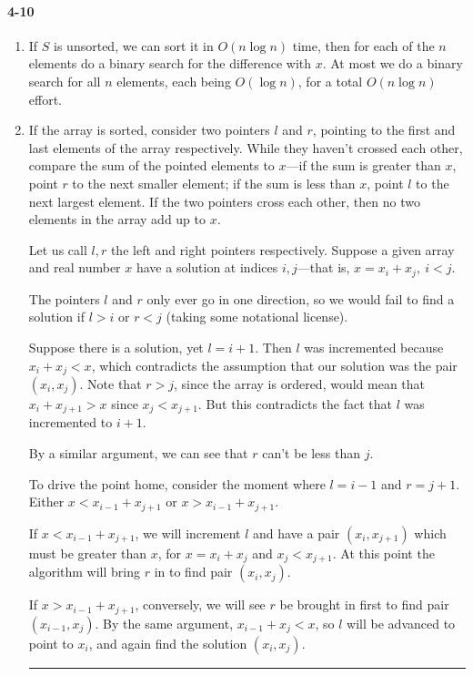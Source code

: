 \documentclass{report}
\newcommand{\okthen}{\rule[-1.4pt]{0.3em}{0.77em}}
\begin{document}
\paragraph{4-10}
\begin{enumerate}[label=(\alph*)]
	\item If $S$ is unsorted, we can sort it in $O(n\log n)$ time, then for each of the $n$ elements do a binary search for the difference with $x$. At most we do a binary search for all $n$ elements, each being $O(\log n)$, for a total $O(n\log n)$ effort.

	\item If the array is sorted, consider two pointers $l$ and $r$, pointing to the first and last elements of the array respectively. While they haven't crossed each other, compare the sum of the pointed elements to $x$---if the sum is greater than $x$, point $r$ to the next smaller element; if the sum is less than $x$, point $l$ to the next largest element. If the two pointers cross each other, then no two elements in the array add up to $x$.

	\medskip

	Let us call $l, r$ the left and right pointers respectively. Suppose a given array and real number $x$ have a solution at indices $i, j$---that is, $x = x_i + x_j,\ i<j$.

	The pointers $l$ and $r$ only ever go in one direction, so we would fail to find a solution if $l>i$ or $r<j$ (taking some notational license).

	Suppose there is a solution, yet $l = i+1$. Then $l$ was incremented because $x_i + x_j < x$, which contradicts the assumption that our solution was the pair $(x_i, x_j)$. Note that $r>j$, since the array is ordered, would mean that $x_i+x_{j+1} > x$ since $x_j < x_{j+1}$. But this contradicts the fact that $l$ was incremented to $i+1$.

	By a similar argument, we can see that $r$ can't be less than $j$.

	\medskip

	To drive the point home, consider the moment where $l=i-1$ and $r=j+1$. Either $x < x_{i-1} + x_{j+1}$ or $x > x_{i-1} + x_{j+1}$.

	If $x < x_{i-1} + x_{j+1}$, we will increment $l$ and have a pair $(x_i,x_{j+1})$ which must be greater than $x$, for $x = x_i + x_j$ and $x_j < x_{j+1}$. At this point the algorithm will bring $r$ in to find pair $(x_i, x_j)$.

	If $x > x_{i-1} + x_{j+1}$, conversely, we will see $r$ be brought in first to find pair $(x_{i-1}, x_j)$. By the same argument, $x_{i-1} + x_j < x$, so $l$ will be advanced to point to $x_i$, and again find the solution $(x_i,x_j)$.\ \okthen
\end{enumerate}
\end{document}
